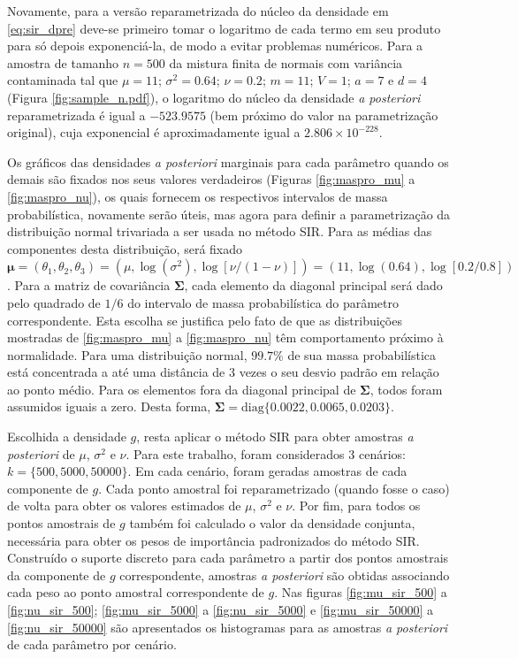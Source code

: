 Novamente, para a versão reparametrizada do núcleo da densidade em \eqref{eq:sir_dpre} deve-se primeiro tomar o logaritmo de cada termo em seu produto para só depois exponenciá-la, de modo a evitar problemas numéricos. Para a amostra de tamanho $n=500$ da mistura finita de normais com variância contaminada tal que $\mu = 11$; $\sigma^2 = 0.64$; $\nu = 0.2$; $m = 11$; $V = 1$; $a = 7$ e $d = 4$ (Figura \ref{fig:sample_n.pdf}), o logaritmo do núcleo da densidade \textit{a posteriori} reparametrizada é igual a $-523.9575$ (bem próximo do valor na parametrização original), cuja exponencial é aproximadamente igual a $2.806 \times 10^{-228}$.

Os gráficos das densidades \textit{a posteriori} marginais para cada parâmetro quando os demais são fixados nos seus valores verdadeiros (Figuras \ref{fig:maspro_mu} a \ref{fig:maspro_nu}), os quais fornecem os respectivos intervalos de massa probabilística, novamente serão úteis, mas agora para definir a parametrização da distribuição normal trivariada a ser usada no método SIR. Para as médias das componentes desta distribuição, será fixado $\bm{\mu} = (\theta_1, \theta_2, \theta_3) = (\mu, \log(\sigma^2), \log[\nu/(1-\nu)]) = (11, \log(0.64), \log[0.2/0.8])$. Para a matriz de covariância $\bm{\Sigma}$, cada elemento da diagonal principal será dado pelo quadrado de $1/6$ do intervalo de massa probabilística do parâmetro correspondente. Esta escolha se justifica pelo fato de que as distribuições mostradas de \ref{fig:maspro_mu} a \ref{fig:maspro_nu} têm comportamento próximo à normalidade. Para uma distribuição normal, $99.7\%$ de sua massa probabilística está concentrada a até uma distância de 3 vezes o seu desvio padrão em relação ao ponto médio. Para os elementos fora da diagonal principal de $\bm{\Sigma}$, todos foram assumidos iguais a zero. Desta forma, $\bm{\Sigma} = \textrm{diag}\{0.0022, 0.0065, 0.0203\}$.

Escolhida a densidade $g$, resta aplicar o método SIR para obter amostras \textit{a posteriori} de $\mu$, $\sigma^2$ e $\nu$. Para este trabalho, foram considerados 3 cenários: $k = \{500, 5000, 50000\}$. Em cada cenário, foram geradas amostras de cada componente de $g$. Cada ponto amostral foi reparametrizado (quando fosse o caso) de volta para obter os valores estimados de $\mu$, $\sigma^2$ e $\nu$. Por fim, para todos os pontos amostrais de $g$ também foi calculado o valor da densidade conjunta, necessária para obter os pesos de importância padronizados do método SIR. Construído o suporte discreto para cada parâmetro a partir dos pontos amostrais da componente de $g$ correspondente, amostras \textit{a posteriori} são obtidas associando cada peso ao ponto amostral correspondente de $g$. Nas figuras \ref{fig:mu_sir_500} a \ref{fig:nu_sir_500}; \ref{fig:mu_sir_5000} a \ref{fig:nu_sir_5000} e \ref{fig:mu_sir_50000} a \ref{fig:nu_sir_50000} são apresentados os histogramas para as amostras \textit{a posteriori} de cada parâmetro por cenário.

